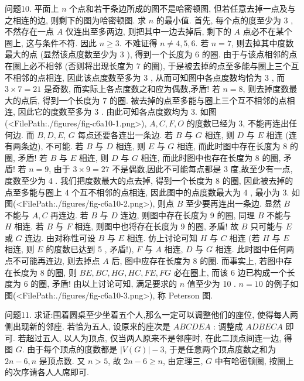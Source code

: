 问题10. 平面上 $n$ 个点和若干条边所成的图不是哈密顿图, 但若任意去掉一点及与之相连的边, 则剩下的图为哈密顿图.
求 $n$ 的最小值.
首先, 每个点的度至少为 3 , 不然存在一点 $A$ 仅连出至多两边, 则把其中一边去掉后, 剩下的 $A$ 点必不在某个圈上, 这与条件不符.
因此 $n \geqslant 3$.
不难证得 $n \neq 4,5,6$.
若 $n=7$, 则去掉其中度数最大的点 (显然该点度数至少为 3 ), 得到一个长度为 6 的圈.
由于与该点相邻的点在圈上必不相邻 (否则将出现长度为 7 的圈), 于是被去掉的点至多能与圈上三个互不相邻的点相连, 因此该点度数至多为 3 , 从而可知图中各点度数均恰为 3 , 而 $3 \times 7=21$ 是奇数, 而实际上各点度数之和应为偶数,矛盾!
若 $n=8$, 则去掉度数最大的点后, 得到一个长度为 7 的圈.
被去掉的点至多能与圈上三个互不相邻的点相连, 因此它的度数至多为 3 . 由此可知各点度数均为 3. 如图(<FilePath:./figures/fig-c6a10-1.png>), $A, C, F, O$ 的度数已经为 3, 不能再连出任何边.
而 $B, D, E$, $G$ 每点还要各连出一条边.
若 $B$ 与 $G$ 相连, 则 $D$ 与 $E$ 相连 (连有两条边), 不可能.
若 $B$ 与 $D$ 相连, 则 $E$ 与 $G$ 相连, 而此时图中存在长度为 8 的圈, 矛盾! 若 $B$ 与 $E$ 相连, 则 $D$ 与 $G$ 相连, 而此时图中也存在长度为 8 的圈, 矛盾!
若 $n=9$, 由于 $3 \times 9=27$ 不是偶数,因此不可能每点都是 3 度,故至少有一点, 度数至少为 4 . 我们把度数最大的点去掉, 得到一个长度为 8 的圈, 因此被去掉的点至多能与圈上 4 个互不相邻的点相连, 因此图中的点度数最大为 4 , 最小为 3. 如图(<FilePath:./figures/fig-c6a10-2.png>), 则点 $B$ 至少要再连出一条边.
显然 $B$ 不能与 $A, C$ 再连边.
若 $B$ 与 $D$ 连边, 则图中存在长度为 9 的圈, 同理 $B$ 不能与 $H$ 相连.
若 $B$ 与 $F$ 相连, 则图中也将存在长度为 9 的圈, 矛盾! 故 $B$ 只可能与 $E$ 或 $G$ 连边.
由对称性可设 $B$ 与 $E$ 相连.
仿上讨论可知 $H$ 与 $C$ 相连 (若 $H$ 与 $E$ 相连, 则 $E$ 的度数已达到 5 , 矛盾!), $F$ 与 $A$ 相连, $D$ 与 $G$ 相连.
此时图中任何两点不可能再连边, 则去掉点 $A$ 后, 图中应存在长度为 8 的圈.
而事实上, 若图中存在长度为 8 的圈, 则 $B E, B C, H G, H C, F E, F G$ 必在圈上, 而该 6 边已构成一个长度为 6 的圈, 矛盾!
由以上讨论可知, 满足要求的 $n$ 值至少为 10 .
$n=10$ 的例子如图(<FilePath:./figures/fig-c6a10-3.png>), 称 Peterson 图.



问题11. 求证:围着圆桌至少坐着五个人,那么一定可以调整他们的座位, 使得每人两侧出现新的邻座.
若恰为五人, 设原来的座次是 $A B C D E A$ : 调整成 $A D B E C A$ 即可.
若超过五人, 以人为顶点, 仅当两人原来不是邻座时, 在此二顶点间连一边, 得图 $G$. 由于每个顶点的度数都是 $|V(G)|-3$, 于是任意两个顶点度数之和为 $2 n-6, n$ 是顶点数.
又 $n>5$, 故 $2 n-6 \geqslant n$, 由定理三, $G$ 中有哈密顿圈, 按圈上的次序请各人人席即可.


